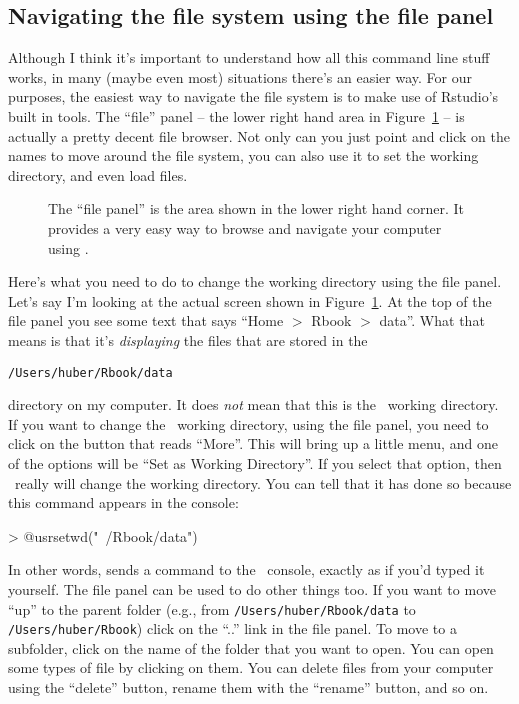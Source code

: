\subsection{Navigating the file system using the \Rstudio file panel\label{sec:nav3}}

Although I think it's important to understand how all this command line stuff works, in many (maybe even most) situations there's an easier way. For our purposes, the easiest way to navigate the file system is to make use of Rstudio's built in tools. The ``file'' panel -- the lower right hand area in Figure~\ref{fig:filepanel} -- is actually a pretty decent file browser. Not only can you just point and click on the names to move around the file system, you can also use it to set the working directory, and even load files. 

\begin{figure}[H]
\begin{center}
\caption{The ``file panel'' is the area shown in the lower right hand corner. It provides a very easy way to browse and navigate your computer using \R.}
\label{fig:filepanel}
\end{center}
\end{figure}

Here's what you need to do to change the working directory using the file panel. Let's say I'm looking at the actual screen shown in Figure~\ref{fig:filepanel}. At the top of the file panel you see some text that says ``Home $>$ Rbook $>$ data''. What that means is that it's {\it displaying} the files that are stored in the 
\begin{verbatim}
/Users/huber/Rbook/data
\end{verbatim}
directory on my computer. It does {\it not} mean that this is the \R\ working directory. If you want to change the \R\ working directory, using the file panel, you need to click on the button that reads ``More''. This will bring up a little menu, and one of the options will be ``Set as Working Directory''. If you select that option, then \R\ really will change the working directory. You can tell that it has done so because this command appears in the console: 
\begin{rblock1}
> @usr{setwd("~/Rbook/data")}
\end{rblock1}
In other words, \Rstudio sends a command to the \R\ console, exactly as if you'd typed it yourself. The file panel can be used to do other things too. If you want to move ``up'' to the parent folder (e.g., from \texttt{/Users/huber/Rbook/data} to \texttt{/Users/huber/Rbook}) click on the ``..'' link in the file panel. To move to a subfolder, click on the name of the folder that you want to open. You can open some types of file by clicking on them. You can delete files from your computer using the ``delete'' button, rename them with the ``rename'' button, and so on.

